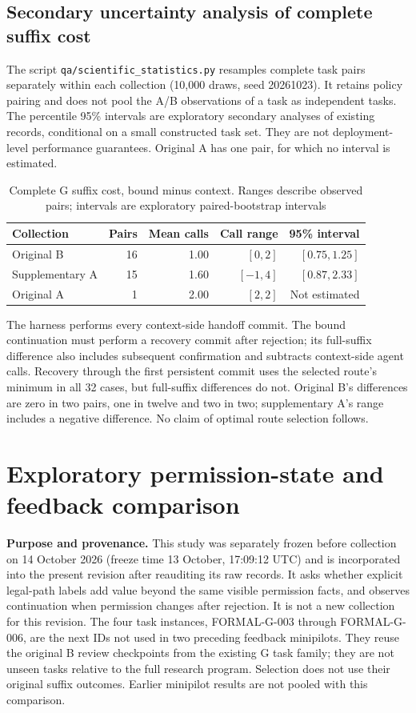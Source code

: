 \subsection*{Secondary uncertainty analysis of complete suffix cost}

The script \texttt{qa/scientific\_statistics.py} resamples complete task
pairs separately within each collection (10,000 draws, seed 20261023).
It retains policy pairing and does not pool the A/B observations of a task
as independent tasks. The percentile 95\% intervals are exploratory secondary
analyses of existing records, conditional on a small constructed task set.
They are not deployment-level performance guarantees. Original A has one
pair, for which no interval is estimated.

\begin{table}[htbp]
\centering\small
\caption{Complete G suffix cost, bound minus context. Ranges describe observed pairs; intervals are exploratory paired-bootstrap intervals}
\begin{tabular}{lrrrr}
\toprule
Collection & Pairs & Mean calls & Call range & 95\% interval\\
\midrule
Original B & 16 & 1.00 & $[0,2]$ & $[0.75,1.25]$\\
Supplementary A & 15 & 1.60 & $[-1,4]$ & $[0.87,2.33]$\\
Original A & 1 & 2.00 & $[2,2]$ & Not estimated\\
\bottomrule
\end{tabular}
\end{table}

The harness performs every context-side handoff commit. The bound continuation
must perform a recovery commit after rejection; its full-suffix difference
also includes subsequent confirmation and subtracts context-side agent calls.
Recovery through the first persistent commit uses the selected route's minimum
in all 32 cases, but full-suffix differences do not. Original B's differences
are zero in two pairs, one in twelve and two in two; supplementary A's range
includes a negative difference. No claim of optimal route selection follows.

\section{Exploratory permission-state and feedback comparison}
\label{sec:a13-feedback}

\textbf{Purpose and provenance.}
This study was separately frozen before collection on 14 October 2026
(freeze time 13 October, 17:09:12 UTC) and is incorporated into the present
revision after reauditing its raw records. It asks whether explicit legal-path
labels add value beyond the same visible permission facts, and observes
continuation when permission changes after rejection. It is not a new
collection for this revision. The four task instances, FORMAL-G-003 through
FORMAL-G-006, are the next IDs not used in two preceding feedback minipilots.
They reuse the original B review checkpoints from the existing G task family;
they are not unseen tasks relative to the full research program. Selection
does not use their original suffix outcomes. Earlier minipilot results are
not pooled with this comparison.

